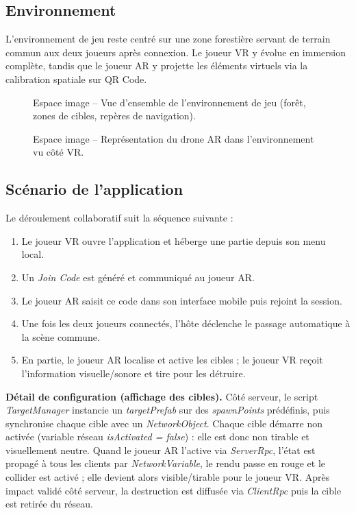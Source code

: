 \documentclass[12pt, a4paper]{article}
\begin{document}
\subsection{Environnement}

L'environnement de jeu reste centré sur une zone forestière servant de terrain commun aux deux joueurs après connexion. Le joueur VR y évolue en immersion complète, tandis que le joueur AR y projette les éléments virtuels via la calibration spatiale sur QR Code.

\begin{figure}[H]
  \centering
  \fbox{\rule{0pt}{6cm}\rule{0.92\linewidth}{0pt}}
  \caption{Espace image -- Vue d'ensemble de l'environnement de jeu (forêt, zones de cibles, repères de navigation).}
  \label{fig:env-overview}
\end{figure}

\begin{figure}[H]
  \centering
  \fbox{\rule{0pt}{6cm}\rule{0.92\linewidth}{0pt}}
  \caption{Espace image -- Représentation du drone AR dans l'environnement vu côté VR.}
  \label{fig:env-drone-vr}
\end{figure}

\subsection{Scénario de l'application}

Le déroulement collaboratif suit la séquence suivante :

\begin{enumerate}
  \item Le joueur VR ouvre l'application et héberge une partie depuis son menu local.
  \item Un \textit{Join Code} est généré et communiqué au joueur AR.
  \item Le joueur AR saisit ce code dans son interface mobile puis rejoint la session.
  \item Une fois les deux joueurs connectés, l'hôte déclenche le passage automatique à la scène commune.
  \item En partie, le joueur AR localise et active les cibles ; le joueur VR reçoit l'information visuelle/sonore et tire pour les détruire.
\end{enumerate}

\textbf{Détail de configuration (affichage des cibles).} Côté serveur, le script \textit{TargetManager} instancie un \textit{targetPrefab} sur des \textit{spawnPoints} prédéfinis, puis synchronise chaque cible avec un \textit{NetworkObject}. Chaque cible démarre non activée (variable réseau \textit{isActivated = false}) : elle est donc non tirable et visuellement neutre. Quand le joueur AR l'active via \textit{ServerRpc}, l'état est propagé à tous les clients par \textit{NetworkVariable}, le rendu passe en rouge et le collider est activé ; elle devient alors visible/tirable pour le joueur VR. Après impact validé côté serveur, la destruction est diffusée via \textit{ClientRpc} puis la cible est retirée du réseau.
\end{document}

